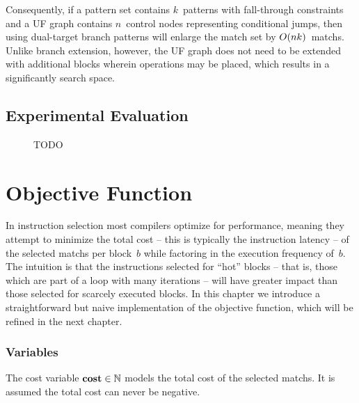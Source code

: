 Consequently, if a \gls{pattern set} contains $k$~\glspl{pattern} with
\gls{fall-through} \glspl{constraint} and a \gls{UF graph} contains
$n$~\glspl{control node} representing conditional jumps, then using
\glspl{dual-target branch pattern} will enlarge the \gls{match set} by
$O(nk)$~\glspl{match}.
%
Unlike \gls{branch extension}, however, the \gls{UF graph} does not need to be
extended with additional \glspl{block} wherein \glspl{operation} may be placed,
which results in a significantly \gls{search space}.


\subsection{Experimental Evaluation}

\begin{figure}
  \centering%
  \maxsizebox{\textwidth}{!}{%
    \trimBarchartPlot{%
    }%
  }

  \caption{TODO}
\end{figure}




\section{Objective Function}

In \gls{instruction selection} most \glspl{compiler} optimize for performance,
meaning they attempt to minimize the total cost -- this is typically the
\gls{instruction} latency -- of the selected \glspl{match} per \gls{block}~$b$
while factoring in the execution frequency of~$b$.
%
The intuition is that the \glspl{instruction} selected for ``hot'' \glspl{block}
-- that is, those which are part of a loop with many iterations -- will have
greater impact than those selected for scarcely executed \glspl{block}.
%
In this chapter we introduce a straightforward but naive implementation of the
\gls{objective function}, which will be refined in the next chapter.


\subsubsection{Variables}

The \gls{cost variable} \mbox{$\mVar{cost} \in \mathbb{N}$} models the total
cost of the selected \glspl{match}.
%
It is assumed the total cost can never be negative.


